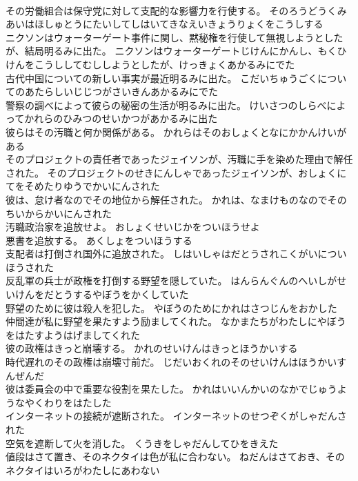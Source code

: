 \documentclass[8pt]{extreport}
\begin{document}
\begin{CJK}{UTF8}{min}
\\	その労働組合は保守党に対して支配的な影響力を行使する。	そのろうどうくみあいはほしゅとうにたいしてしはいてきなえいきょうりょくをこうしする 
\\	ニクソンはウォーターゲート事件に関し、黙秘権を行使して無視しようとしたが、結局明るみに出た。	ニクソンはウォーターゲートじけんにかんし、もくひけんをこうししてむししようとしたが、けっきょくあかるみにでた 
\\	古代中国についての新しい事実が最近明るみに出た。	こだいちゅうごくについてのあたらしいじじつがさいきんあかるみにでた 
\\	警察の調べによって彼らの秘密の生活が明るみに出た。	けいさつのしらべによってかれらのひみつのせいかつがあかるみに出た 
\\	彼らはその汚職と何か関係がある。	かれらはそのおしょくとなにかかんけいがある 
\\	そのプロジェクトの責任者であったジェイソンが、汚職に手を染めた理由で解任された。	そのプロジェクトのせきにんしゃであったジェイソンが、おしょくにてをそめたりゆうでかいにんされた 
\\	彼は、怠け者なのでその地位から解任された。	かれは、なまけものなのでそのちいからかいにんされた 
\\	汚職政治家を追放せよ。	おしょくせいじかをついほうせよ 
\\	悪書を追放する。	あくしょをついほうする 
\\	支配者は打倒され国外に追放された。	しはいしゃはだとうされこくがいについほうされた 
\\	反乱軍の兵士が政権を打倒する野望を隠していた。	はんらんぐんのへいしがせいけんをだとうするやぼうをかくしていた 
\\	野望のために彼は殺人を犯した。	やぼうのためにかれはさつじんをおかした 
\\	仲間達が私に野望を果たすよう励ましてくれた。	なかまたちがわたしにやぼうをはたすようはげましてくれた 
\\	彼の政権はきっと崩壊する。	かれのせいけんはきっとほうかいする 
\\	時代遅れのその政権は崩壊寸前だ。	じだいおくれのそのせいけんはほうかいすんぜんだ 
\\	彼は委員会の中で重要な役割を果たした。	かれはいいんかいのなかでじゅうようなやくわりをはたした 
\\	インターネットの接続が遮断された。	インターネットのせつぞくがしゃだんされた 
\\	空気を遮断して火を消した。	くうきをしゃだんしてひをきえた 
\\	値段はさて置き、そのネクタイは色が私に合わない。	ねだんはさておき、そのネクタイはいろがわたしにあわない 

\end{CJK}
\end{document}
